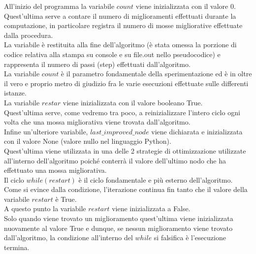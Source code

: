 All'inizio del programma la variabile $count$ viene inizializzata con il valore 0.\\
Quest'ultima serve a contare il numero di miglioramenti effettuati durante la computazione, in particolare registra il numero di mosse migliorative effettuate dalla procedura.\\
La variabile è restituita alla fine dell'algoritmo (è stata omessa la porzione di codice relativa alla stampa su console e su file.out nello pseudocodice) e rappresenta il numero di passi (step) effettuati dall'algoritmo.\\
La variabile $count$ è il parametro fondamentale della sperimentazione ed è in oltre il vero e proprio metro di giudizio fra le varie esecuzioni effettuate sulle differenti istanze.\\

La variabile $restar$ viene inizializzata con il valore booleano True.\\
Quest'ultima serve, come vedremo tra poco, a reinizializzare l'intero ciclo ogni volta che una mossa migliorativa viene trovata dall'algoritmo.\\

Infine un'ulteriore variabile, $last\_improved\_node$ viene dichiarata e inizializzata con il valore None (valore nullo nel linguaggio Python).\\
Quest'ultima viene utilizzata in una delle 2 strategie di ottimizzazione utilizzate all'interno dell'algoritmo poiché conterrà il valore dell'ultimo nodo che ha effettuato una mossa migliorativa.\\

Il ciclo $while(restart)$ è il ciclo fondamentale e più esterno dell'algoritmo.\\
Come si evince dalla condizione, l'iterazione continua fin tanto che il valore della variabile $restart$ è True.\\

A questo punto la variabile $restart$ viene inizializzata a False.\\
Solo quando viene trovato un miglioramento quest'ultima viene inizializzata nuovamente al valore True e dunque, se nessun miglioramento viene trovato dall'algoritmo, la condizione all'interno del $while$ si falsifica è l'esecuzione termina.

